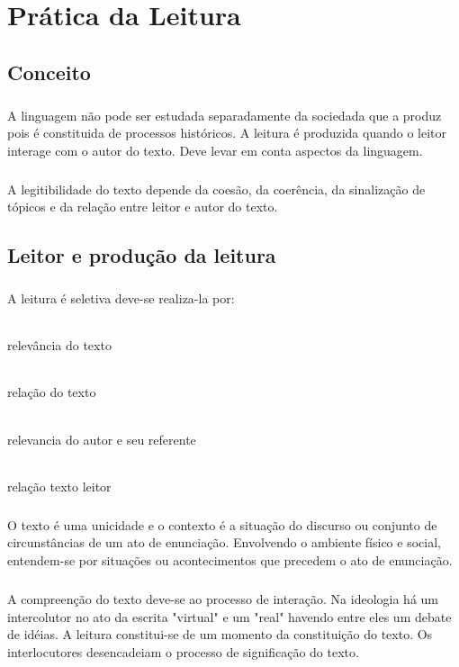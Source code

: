 \chapter{Prática da Leitura}
\section{Conceito}

\paragraph{}

A linguagem não pode ser estudada separadamente da sociedada que a produz pois é constituida de processos históricos.
A leitura é produzida quando o leitor interage com o autor do texto. Deve levar em conta aspectos da linguagem.
\paragraph{}
A legitibilidade do texto depende da coesão, da coerência, da sinalização de tópicos e da relação entre leitor e autor do texto.

\section{Leitor e produção da leitura}

\paragraph{}

A leitura é seletiva deve-se realiza-la por: 
\subparagraph{}
relevância do texto
\subparagraph{}
relação do texto
\subparagraph{}
relevancia do autor e seu referente
\subparagraph{}
relação texto leitor

\paragraph{}

O texto é uma unicidade e o contexto é a situação do discurso ou conjunto de circunstâncias de um ato de enunciação.
Envolvendo o ambiente físico e social, entendem-se por situações ou acontecimentos que precedem o ato de enunciação.

\paragraph{}
A compreenção do texto deve-se ao processo de interação. Na ideologia há um intercolutor no ato da escrita "virtual" e um "real" havendo entre eles um debate de idéias. A leitura constitui-se de um momento da constituição do texto. Os interlocutores desencadeiam o processo de significação do texto.

